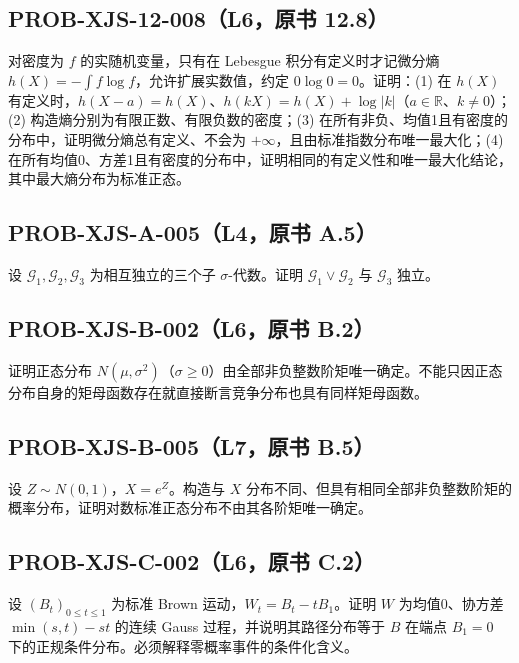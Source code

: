 \documentclass[UTF8]{ctexart}
\begin{document}
\subsection*{PROB-XJS-12-008（L6，原书 12.8）}
对密度为 $f$ 的实随机变量，只有在 Lebesgue 积分有定义时才记微分熵 $h(X)=-\int f\log f$，允许扩展实数值，约定 $0\log0=0$。证明：(1) 在 $h(X)$ 有定义时，$h(X-a)=h(X)$、$h(kX)=h(X)+\log|k|$（$a\in\mathbb R$、$k\ne0$）；(2) 构造熵分别为有限正数、有限负数的密度；(3) 在所有非负、均值1且有密度的分布中，证明微分熵总有定义、不会为 $+\infty$，且由标准指数分布唯一最大化；(4) 在所有均值0、方差1且有密度的分布中，证明相同的有定义性和唯一最大化结论，其中最大熵分布为标准正态。

\subsection*{PROB-XJS-A-005（L4，原书 A.5）}
设 $\mathcal G_1,\mathcal G_2,\mathcal G_3$ 为相互独立的三个子 $\sigma$-代数。证明 $\mathcal G_1\vee\mathcal G_2$ 与 $\mathcal G_3$ 独立。

\subsection*{PROB-XJS-B-002（L6，原书 B.2）}
证明正态分布 $N(\mu,\sigma^2)$（$\sigma\ge0$）由全部非负整数阶矩唯一确定。不能只因正态分布自身的矩母函数存在就直接断言竞争分布也具有同样矩母函数。

\subsection*{PROB-XJS-B-005（L7，原书 B.5）}
设 $Z\sim N(0,1)$，$X=e^Z$。构造与 $X$ 分布不同、但具有相同全部非负整数阶矩的概率分布，证明对数标准正态分布不由其各阶矩唯一确定。

\subsection*{PROB-XJS-C-002（L6，原书 C.2）}
设 $(B_t)_{0\le t\le1}$ 为标准 Brown 运动，$W_t=B_t-tB_1$。证明 $W$ 为均值0、协方差 $\min(s,t)-st$ 的连续 Gauss 过程，并说明其路径分布等于 $B$ 在端点 $B_1=0$ 下的正规条件分布。必须解释零概率事件的条件化含义。
\end{document}
